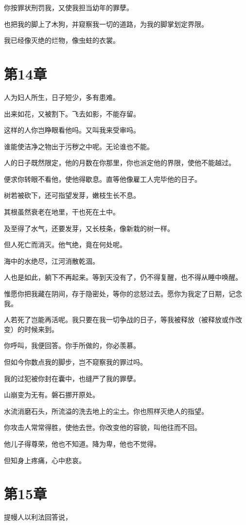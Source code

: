 \documentclass[12pt,oneside]{book}
\begin{document}
你按罪状刑罚我，又使我担当幼年的罪孽。

也把我的脚上了木狗，并窥察我一切的道路，为我的脚掌划定界限。

我已经像灭绝的烂物，像虫蛀的衣裳。



\chapter{第14章}
人为妇人所生，日子短少，多有患难。

出来如花，又被割下。飞去如影，不能存留。

这样的人你岂睁眼看他吗。又叫我来受审吗。

谁能使洁净之物出于污秽之中呢。无论谁也不能。

人的日子既然限定，他的月数在你那里，你也派定他的界限，使他不能越过。

便求你转眼不看他，使他得歇息。直等他像雇工人完毕他的日子。

树若被砍下，还可指望发芽，嫩枝生长不息。

其根虽然衰老在地里，干也死在土中。

及至得了水气，还要发芽，又长枝条，像新栽的树一样。

但人死亡而消灭。他气绝，竟在何处呢。

海中的水绝尽，江河消散乾涸。

人也是如此，躺下不再起来。等到天没有了，仍不得复醒，也不得从睡中唤醒。

惟愿你把我藏在阴间，存于隐密处，等你的忿怒过去。愿你为我定了日期，记念我。

人若死了岂能再活呢。我只要在我一切争战的日子，等我被释放（被释放或作改变）的时候来到。

你呼叫，我便回答。你手所做的，你必羡慕。

但如今你数点我的脚步，岂不窥察我的罪过吗。

我的过犯被你封在囊中，也缝严了我的罪孽。

山崩变为无有。磐石挪开原处。

水流消磨石头，所流溢的洗去地上的尘土。你也照样灭绝人的指望。

你攻击人常常得胜，使他去世。你改变他的容貌，叫他往而不回。

他儿子得尊荣，他也不知道。降为卑，他也不觉得。

但知身上疼痛，心中悲哀。


\chapter{第15章}
提幔人以利法回答说，
\end{document}

